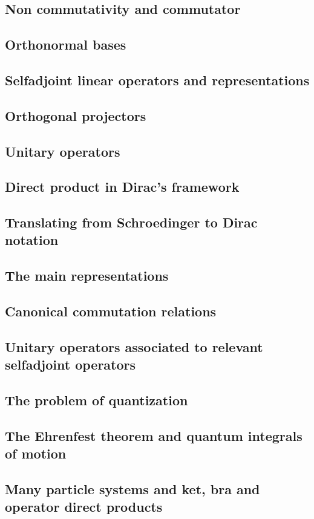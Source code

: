 \documentclass{article}
\begin{document}
\subsection{Non commutativity and commutator}
\subsection{Orthonormal bases}
\subsection{Selfadjoint linear operators and representations}
\subsection{Orthogonal projectors}
\subsection{Unitary operators}
\subsection{Direct product in Dirac’s framework}
\subsection{Translating from Schroedinger to Dirac notation}
\subsection{The main representations}
\subsection{Canonical commutation relations}
\subsection{Unitary operators associated to relevant selfadjoint operators}
\subsection{The problem of quantization}
\subsection{The Ehrenfest theorem and quantum integrals of motion}
\subsection{Many particle systems and ket, bra and operator direct products}
\end{document}

